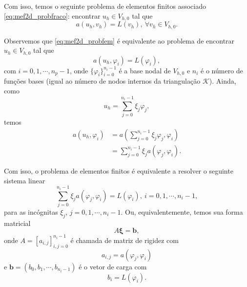 Com isso, temos o seguinte problema de elementos finitos associado \eqref{eq:mef2d_probfraco}: encontrar $u_h\in V_{h,0}$ tal que
\begin{equation}\label{eq:mef2d_probfem}
  a(u_h,v_h) = L(v_h),~\forall v_h\in V_{h,0}.
\end{equation}

Observemos que \eqref{eq:mef2d_probfem} é equivalente ao problema de encontrar $u_h\in V_{h,0}$ tal que
\begin{equation}\label{eq:mef2d_proba1}
  a(u_h,\varphi_i) = L(\varphi_i),
\end{equation}
com $i=0, 1, \cdots, n_p-1$, onde $\{\varphi_i\}_{i=0}^{n_i-1}$ é a base nodal de $V_{h,0}$ e $n_i$ é o número de funções bases (igual ao número de nodos internos da triangulação $\mathcal{K}$). Ainda, como
\begin{equation}
  u_h = \sum_{j=0}^{n_i-1} \xi_j\varphi_j,
\end{equation}
temos 
\begin{align}
  a(u_h, \varphi_i) &= a\left(\sum_{j=0}^{n_i-1}\xi_j\varphi_j,\varphi_i\right) \\
  &= \sum_{j=0}^{n_i-1}\xi_ja(\varphi_j,\varphi_i).
\end{align}

Com isso, o problema de elementos finitos é equivalente a resolver o seguinte sistema linear
\begin{equation}
  \sum_{j=0}^{n_i-1}\xi_ja(\varphi_j,\varphi_i) = L(\varphi_i),~i=0, 1, \cdots, n_i-1,
\end{equation}
para as incógnitas $\xi_j$, $j=0, 1, \cdots, n_i-1$. Ou, equivalentemente, temos sua forma matricial
\begin{equation}
  A\pmb{\xi} = \pmb{b},
\end{equation}
onde $A = [a_{i,j}]_{i,j=0}^{n_i-1}$ é chamada de matriz de rigidez com
\begin{equation}
  a_{i,j} = a(\varphi_j, \varphi_i)
\end{equation}
e $\pmb{b} = (b_0, b_1, \cdots, b_{n_i-1})$ é o vetor de carga com
\begin{equation}
  b_i = L(\varphi_i).
\end{equation}

